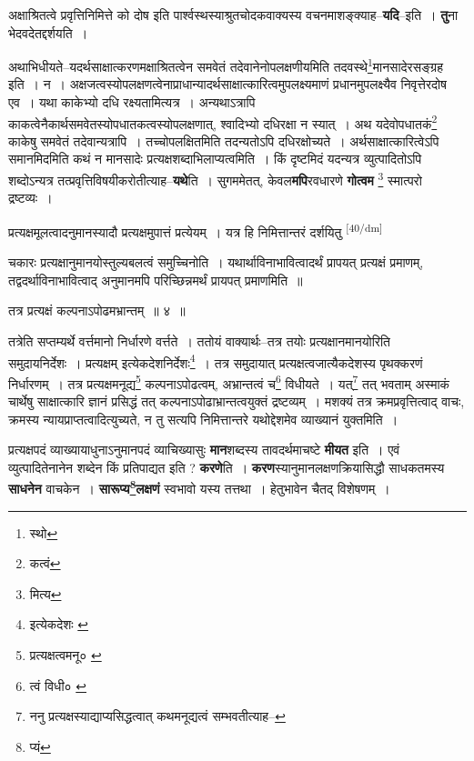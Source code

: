 \documentclass[article,12pt,a4paper]{memoir}
\begin{document}
	  \pstart अक्षाश्रितत्वे प्रवृत्तिनिमित्ते को दोष इति पार्श्वस्थस्याश्रुतचोदकवाक्यस्य वचनमाशङ्क्याह--\textbf{यदि}--इति । \textbf{तु}ना भेदवदेतद्दर्शयति ।
	\pend
      

	  \pstart अथाभिधीयते--यदर्थसाक्षात्करणमक्षाश्रितत्वेन समवेतं तदेवानेनोपलक्षणीयमिति तदवस्थे\footnote{स्थो}मानसादेरसङ्ग्रह इति । न । अक्षजत्वस्योपलक्षणत्वेनाप्राधान्यादर्थसाक्षात्कारित्वमुपलक्ष्यमाणं प्रधानमुपलक्ष्यैव निवृत्तेरदोष एव । यथा काकेभ्यो दधि रक्ष्यतामित्यत्र । अन्यथाऽत्रापि काकत्वेनैकार्थसमवेतस्योपधातकत्वस्योपलक्षणात्, श्वादिभ्यो दधिरक्षा न स्यात् । अथ यदेवोपधातकं\footnote{कत्वं} काकेषु समवेतं तदेवान्यत्रापि । तच्चोपलक्षितमिति तदन्यतोऽपि दधिरक्षोच्यते । अर्थसाक्षात्कारित्वेऽपि समानमिदमिति कथं न मानसादेः प्रत्यक्षशब्दाभिलाप्यत्वमिति । किं दृष्टमिदं यदन्यत्र व्युत्पादितोऽपि शब्दोऽन्यत्र तत्प्रवृत्तिविषयीकरोतीत्याह--\textbf{यथे}ति । सुगममेतत्, केवल\textbf{मपि}रवधारणे \textbf{गोत्वम} \footnote{मित्य} स्मात्परो द्रष्टव्यः ।
	\pend
      

	  \pstart प्रत्यक्षमूलत्वादनुमानस्यादौ प्रत्यक्षमुपात्तं प्रत्येयम् । यत्र हि निमित्तान्तरं दर्शयितु  \leavevmode\textsuperscript{\rmlatinfont\tiny [40/dm]} 
	  
	चकारः प्रत्यक्षानुमानयोस्तुल्यबलत्वं समुच्चिनोति । यथार्थाविनाभावित्वादर्थं प्रापयत् प्रत्यक्षं प्रमाणम्, तद्वदर्थाविनाभावित्वाद् अनुमानमपि परिच्छिन्नमर्थं प्रायपत् प्रमाणमिति ॥ 
	  
	तत्र प्रत्यक्षं कल्पनाऽपोढमभ्रान्तम् ॥ ४ ॥ 
	  
	तत्रेति सप्तम्यर्थे वर्त्तमानो निर्धारणे वर्त्तते । ततोयं वाक्यार्थः--तत्र तयोः प्रत्यक्षानमानयोरिति समुदायनिर्देशः । प्रत्यक्षम् इत्येकदेशनिर्देशः\footnote{इत्येकदेशः \cite{dp-msA} \cite{dp-msC} \cite{dp-edP} \cite{dp-edE} \cite{dp-edH}} । तत्र समुदायात् प्रत्यक्षत्वजात्यैकदेशस्य पृथक्करणं निर्धारणम् । तत्र प्रत्यक्षमनूद्य\footnote{प्रत्यक्षत्वमनू० \cite{dp-msB} \cite{dp-msD} \cite{dp-edP} \cite{dp-edE} \cite{dp-edH} \cite{dp-edN}} कल्पनाऽपोढत्वम्, अभ्रान्तत्वं च\footnote{त्वं विधी० \cite{dp-msB}} विधीयते । यत्\footnote{ननु प्रत्यक्षस्याद्याप्यसिद्धत्वात् कथमनूद्यत्वं सम्भवतीत्याह--\cite{dp-msD-n}} तत् भवताम् अस्माकं चार्थेषु साक्षात्कारि ज्ञानं प्रसिद्धं तत् कल्पनाऽपोढाभ्रान्तत्वयुक्तं द्रष्टव्यम् । मशक्यं तत्र क्रमप्रवृत्तित्वाद् वाचः, क्रमस्य न्यायप्राप्तत्वादित्युच्यते, न तु सत्यपि निमित्तान्तरे यथोद्देशमेव व्याख्यानं युक्तमिति ।
	\pend
      

	  \pstart प्रत्यक्षपदं व्याख्यायाधुनाऽनुमानपदं व्याचिख्यासुः \textbf{मान}शब्दस्य तावदर्थमाचष्टे \textbf{मीयत} इति । एवं व्युत्पादितेनानेन शब्देन किं प्रतिपाद्यत इति ? \textbf{करणे}ति । \textbf{करण}स्यानुमानलक्षणक्रियासिद्धौ साधकतमस्य \textbf{साधनेन} वाचकेन । \textbf{सारूप्य\footnote{प्यं}लक्षणं} स्वभावो यस्य तत्तथा । हेतुभावेन चैतद् विशेषणम् ।
	\pend
      
\end{document}
